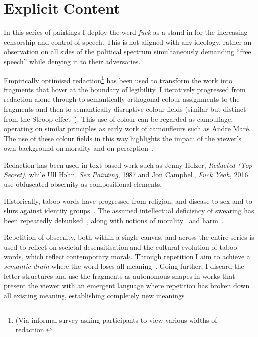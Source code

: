 \documentclass[12pt]{article}
\begin{document}
\section{Explicit Content}
In this series of paintings I deploy the word \emph{fuck} as a stand-in for the increasing censorship and control of speech\cite{atkins2006censoring}. This is not aligned with any ideology, rather an observation on all sides of the political spectrum simultaneously demanding ``free speech'' while denying it to their adversaries\cite{lukianoff2023cancelling}.

Empirically optimised redaction\footnote{ (Via informal survey asking participants to view various widths of redaction.} has been used to transform the work into fragments that hover at the boundary of legibility. I iteratively progressed from redaction alone through to semantically orthogonal colour assignments to the fragments and then to semantically disruptive colour fields (similar but distinct from the Stroop effect~\cite{stroop1935studies}). This use of colour can be regarded as camouflage, operating on similar principles as early work of camoufleurs such as Andre Mar\'e. 
The use of these colour fields in this way highlights the impact of the viewer's own background on morality and on perception~\cite{kuhn1970structure,popper1972objective}.

Redaction has been used in text-based work such as Jenny Holzer, \emph{Redacted (Top Secret)}, while Ull Hohn, \emph{Sex Painting}, 1987 and Jon Campbell, \emph{Fuck Yeah}, 2016 use obfuscated obscenity as compositional elements. 

Historically, taboo words have progressed from religion, and disease to sex and to slurs against identity groups~\cite{douglas1966purity,pinker2008seven,mcwhorter2024nine}. The assumed intellectual deficiency of swearing has been repeatedly debunked~\cite{reiman2022swearfluency,jay2015taboo}, along with notions of morality~\cite{pinker2017moral,devries2023swearing} and harm~\cite{jay2009offensive}.

Repetition of obscenity, both within a single canvas, and across the entire series is used to reflect on societal desensitisation and the cultural evolution of taboo words, which reflect contemporary morals.  Through repetition I aim to achieve a \emph{semantic drain} where the word loses all meaning~\cite{barthes1957mythologies,derrida1972dissemination}. Going further, I discard the letter structures and use the fragments as autonomous shapes in works that present the viewer with an emergent language where repetition has broken down all existing meaning, establishing completely new meanings~\cite{derrida1972dissemination,deleuze1968difference,baudrillard1981simulacra}.
\end{document}
